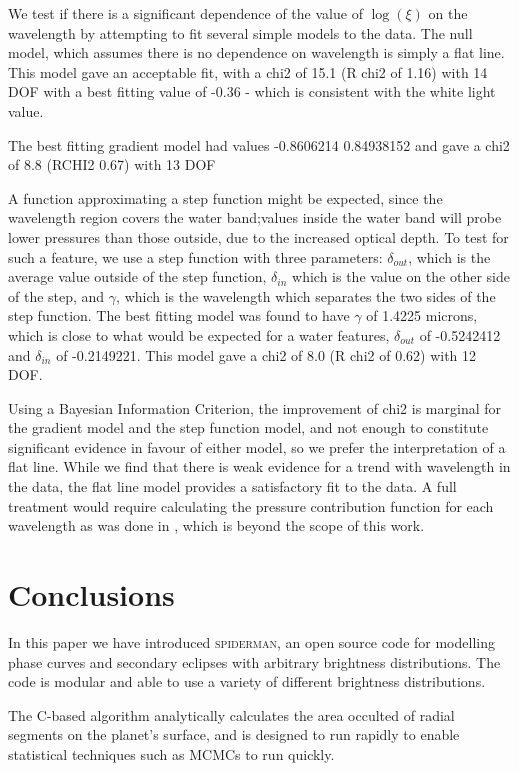 \documentclass[a4paper,fleqn,usenatbib]{mnras}
\begin{document}
We test if there is a significant dependence of the value of $\log(\xi)$ on the wavelength by attempting to fit several simple models to the data. The null model, which assumes there is no dependence on wavelength is simply a flat line. This model gave an acceptable fit, with a chi2 of 15.1 (R chi2 of 1.16) with 14 DOF with a best fitting value of -0.36 - which is consistent with the white light value.

The best fitting gradient model had values -0.8606214   0.84938152 and gave a chi2 of 8.8 (RCHI2 0.67) with 13 DOF

A function approximating a step function might be expected, since the wavelength region covers the water band;values inside the water band will probe lower pressures than those outside, due to the increased optical depth. To test for such a feature, we use a step function with three parameters: $\delta_{out}$, which is the average value outside of the step function, $\delta_{in}$ which is the value on the other side of the step, and $\gamma$, which is the wavelength which separates the two sides of the step function. The best fitting model was found to have $\gamma$ of 1.4225 microns, which is close to what would be expected for a water features, $\delta_{out}$ of -0.5242412 and $\delta_{in}$ of -0.2149221. This model gave a chi2 of 8.0 (R chi2 of 0.62) with 12 DOF. 

Using a Bayesian Information Criterion, the improvement of chi2 is marginal for the gradient model and the step function model, and not enough to constitute significant evidence in favour of either model, so we prefer the interpretation of a flat line. While we find that there is weak evidence for a trend with wavelength in the data, the flat line model provides a satisfactory fit to the data. A full treatment would require calculating the pressure contribution function for each wavelength as was done in \citet{Stevenson2014}, which is beyond the scope of this work.

\section{Conclusions}\label{sec:conclusions}

In this paper we have introduced \textsc{spiderman}, an open source code for modelling phase curves and secondary eclipses with arbitrary brightness distributions. The code is modular and able to use a variety of different brightness distributions.

The C-based algorithm analytically calculates the area occulted of radial segments on the planet's surface, and is designed to run rapidly to enable statistical techniques such as MCMCs to run quickly.
\end{document}
